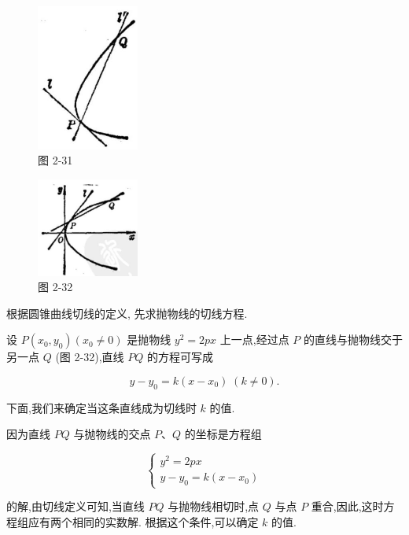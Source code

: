 \documentclass[lang=cn,newtx,12pt,scheme=chinese]{elegantbook}
\begin{document}
\begin{figure}[h]
  \centering
  \includegraphics[max width=0.3\textwidth]{images/01912cc2-ffb6-728e-9ae7-b113ff05c64b_117_209153.jpg}
  \caption{图 2-31}
\end{figure}

\begin{figure}[h]
  \centering
  \includegraphics[max width=0.3\textwidth]{images/01912cc2-ffb6-728e-9ae7-b113ff05c64b_117_627681.jpg}
  \caption{图 2-32}
\end{figure}

根据圆锥曲线切线的定义, 先求抛物线的切线方程.

设 \(P\left( {{x}_{0},{y}_{0}}\right) \left( {{x}_{0} \neq 0}\right)\) 是抛物线 \({y}^{2} = {2px}\) 上一点,经过点 \(P\) 的直线与抛物线交于另一点 \(Q\) (图 2-32),直线 \({PQ}\) 的方程可写成

\[
  y - {y}_{0} = k\left( {x - {x}_{0}}\right) \;\left( {k \neq 0}\right) .
\]

下面,我们来确定当这条直线成为切线时 \(k\) 的值.

因为直线 \({PQ}\) 与抛物线的交点 \(P\text{、}Q\) 的坐标是方程组

\[
  \left\{ \begin{array}{l} {y}^{2} = {2px} \\ y - {y}_{0} = k\left( {x - {x}_{0}}\right) \end{array}\right. \tag{1 2}
\]

的解,由切线定义可知,当直线 \({PQ}\) 与抛物线相切时,点 \(Q\) 与点 \(P\) 重合,因此,这时方程组应有两个相同的实数解. 根据这个条件,可以确定 \(k\) 的值.
\end{document}

